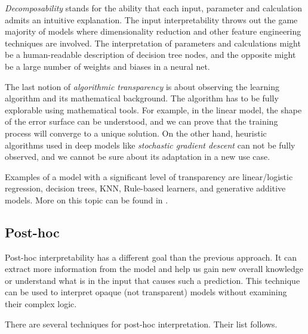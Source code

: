 \emph{Decomposability} stands for the ability that each input, parameter and calculation admits an intuitive explanation. The input interpretability throws out the game majority of models where dimensionality reduction and other feature engineering techniques are involved. The interpretation of parameters and calculations might be a human-readable description of decision tree nodes, and the opposite might be a large number of weights and biases in a neural net.

The last notion of \emph{algorithmic transparency} is about observing the learning algorithm and its mathematical background. The algorithm has to be fully explorable using mathematical tools. For example, in the linear model, the shape of the error surface can be understood, and we can prove that the training process will converge to a unique solution. On the other hand, heuristic algorithms used in deep models like \emph{stochastic gradient descent} can not be fully observed, and we cannot be sure about its adaptation in a new use case.

Examples of a model with a significant level of transparency are linear/logistic regression, decision trees, KNN, Rule-based learners, and generative additive models. More on this topic can be found in \cite{Arrieta2019}.

\subsection{Post-hoc}
Post-hoc interpretability has a different goal than the previous approach. It can extract more information from the model and help us gain new overall knowledge or understand what is in the input that causes such a prediction. This technique can be used to interpret opaque (not transparent) models without examining their complex logic.

There are several techniques for post-hoc interpretation. Their list follows.

